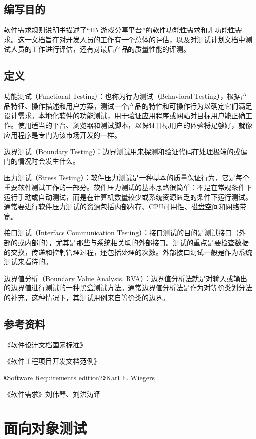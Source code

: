 \documentclass[12pt]{ctexart} %
\begin{document}
\subsection{编写目的}

软件需求规则说明书描述了“H5 游戏分享平台”的软件功能性需求和非功能性需求。这一文档旨在对开发人员的工作有一个总体的评估，以及对测试计划文档中测试人员的工作进行评估，还有对最后产品的质量性能的评测。
\subsection{定义}

功能测试（Functional Testing）：也称为行为测试（Behavioral Testing），根据产品特征、操作描述和用户方案，测试一个产品的特性和可操作行为以确定它们满足设计需求。本地化软件的功能测试，用于验证应用程序或网站对目标用户能正确工作。使用适当的平台、浏览器和测试脚本，以保证目标用户的体验将足够好，就像应用程序是专门为该市场开发的一样。

边界测试（Boundary Testing）：边界测试用来探测和验证代码在处理极端的或偏门的情况时会发生什么。

压力测试（Stress Testing）：软件压力测试是一种基本的质量保证行为，它是每个重要软件测试工作的一部分。软件压力测试的基本思路很简单：不是在常规条件下运行手动或自动测试，而是在计算机数量较少或系统资源匮乏的条件下运行测试。通常要进行软件压力测试的资源包括内部内存、CPU可用性、磁盘空间和网络带宽。

接口测试（Interface Communication Testing）：接口测试的目的是测试接口（外部的或内部的），尤其是那些与系统相关联的外部接口。测试的重点是要检查数据的交换，传递和控制管理过程，还包括处理的次数。外部接口测试一般是作为系统测试来看待的。

边界值分析（Boundary Value Analysis, BVA）：边界值分析法就是对输入或输出的边界值进行测试的一种黑盒测试方法。通常边界值分析法是作为对等价类划分法的补充，这种情况下，其测试用例来自等价类的边界。
\subsection{参考资料}

《软件设计文档国家标准》

《软件工程项目开发文档范例》

《Software Requirements edition2》Karl E. Wiegers

《软件需求》刘伟琴、刘洪涛译
\section{面向对象测试}
\end{document}
